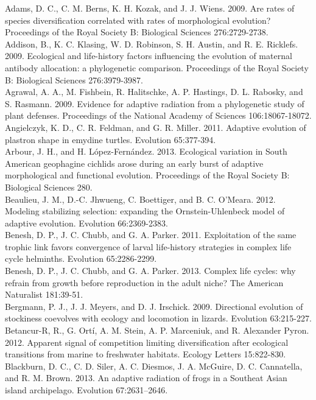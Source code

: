 \indent
Adams, D. C., C. M. Berns, K. H. Kozak, and J. J. Wiens. 2009. Are rates of species diversification correlated with rates of morphological evolution? Proceedings of the Royal Society B: Biological Sciences 276:2729-2738.\\
Addison, B., K. C. Klasing, W. D. Robinson, S. H. Austin, and R. E. Ricklefs. 2009. Ecological and life-history factors influencing the evolution of maternal antibody allocation: a phylogenetic comparison. Proceedings of the Royal Society B: Biological Sciences 276:3979-3987.\\
Agrawal, A. A., M. Fishbein, R. Halitschke, A. P. Hastings, D. L. Rabosky, and S. Rasmann. 2009. Evidence for adaptive radiation from a phylogenetic study of plant defenses. Proceedings of the National Academy of Sciences 106:18067-18072.\\
Angielczyk, K. D., C. R. Feldman, and G. R. Miller. 2011. Adaptive evolution of plastron shape in emydine turtles. Evolution 65:377-394.\\
Arbour, J. H., and H. L\'{o}pez-Fern\'{a}ndez. 2013. Ecological variation in South American geophagine cichlids arose during an early burst of adaptive morphological and functional evolution. Proceedings of the Royal Society B: Biological Sciences 280.\\
Beaulieu, J. M., D.-C. Jhwueng, C. Boettiger, and B. C. O’Meara. 2012. Modeling stabilizing selection: expanding the Ornstein-Uhlenbeck model of adaptive evolution. Evolution 66:2369-2383.\\
Benesh, D. P., J. C. Chubb, and G. A. Parker. 2011. Exploitation of the same trophic link favors convergence of larval life-history strategies in complex life cycle helminths. Evolution 65:2286-2299.\\
Benesh, D. P., J. C. Chubb, and G. A. Parker. 2013. Complex life cycles: why refrain from growth before reproduction in the adult niche? The American Naturalist 181:39-51.\\
Bergmann, P. J., J. J. Meyers, and D. J. Irschick. 2009. Directional evolution of stockiness coevolves with ecology and locomotion in lizards. Evolution 63:215-227.\\
Betancur-R, R., G. Ortí, A. M. Stein, A. P. Marceniuk, and R. Alexander Pyron. 2012. Apparent signal of competition limiting diversification after ecological transitions from marine to freshwater habitats. Ecology Letters 15:822-830.\\
Blackburn, D. C., C. D. Siler, A. C. Diesmos, J. A. McGuire, D. C. Cannatella, and R. M. Brown. 2013. An adaptive radiation of frogs in a Southeat Asian island archipelago. Evolution 67:2631–2646.\\
